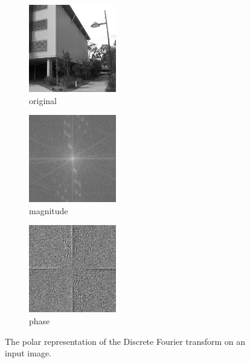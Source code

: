 \begin{figure}[t!] 
        \centering
        \begin{subfigure}[b]{2.0in}
                \includegraphics[width=1.5in]{images/pc/original}
                \caption{original}
                \label{fig:PCSecOrig1}
        \end{subfigure}%
        \begin{subfigure}[b]{2.0in}
                \includegraphics[width=1.5in]{images/pc/magnitude}
                \caption{magnitude}
                \label{fig:PCSecMag}
        \end{subfigure}%
                \begin{subfigure}[b]{2.0in}
                \includegraphics[width=1.5in]{images/pc/phase}
                \caption{phase}
                \label{fig:PCSecPhase}
        \end{subfigure}%
       \caption{The polar representation of the Discrete Fourier transform on an input image.}\label{fig:PCSecA}
\end{figure}

